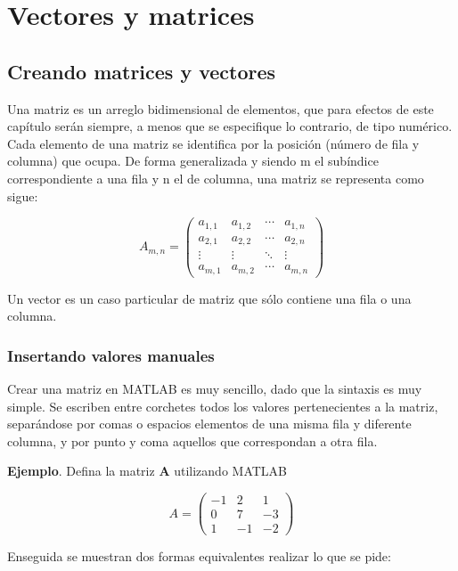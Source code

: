 \chapter{Vectores y matrices}\label{vectores-y-matrices}

\section{Creando matrices y vectores}\label{creando-matrices-y-vectores}

Una matriz es un arreglo bidimensional de elementos, que para efectos de
este capítulo serán siempre, a menos que se especifique lo contrario, de
tipo numérico. Cada elemento de una matriz se identifica por la posición
(número de fila y columna) que ocupa. De forma generalizada y siendo m
el subíndice correspondiente a una fila y n el de columna, una matriz se
representa como sigue:

$$
A_{m,n} = 
\begin{pmatrix}
a_{1,1} & a_{1,2} & \cdots & a_{1,n} \\
a_{2,1} & a_{2,2} & \cdots & a_{2,n} \\
\vdots  & \vdots  & \ddots & \vdots  \\
a_{m,1} & a_{m,2} & \cdots & a_{m,n} 
\end{pmatrix}
$$

Un vector es un caso particular de matriz que sólo contiene una fila o
una columna.

\subsection{Insertando valores
manuales}\label{insertando-valores-manuales}

Crear una matriz en MATLAB es muy sencillo, dado que la sintaxis es muy
simple. Se escriben entre corchetes todos los valores pertenecientes a
la matriz, separándose por comas o espacios elementos de una misma fila
y diferente columna, y por punto y coma aquellos que correspondan a otra
fila.

\textbf{Ejemplo}. Defina la matriz \textbf{A} utilizando MATLAB

$$
A = 
\begin{pmatrix}
    -1 & 2 & 1 \\
    0 & 7 & -3 \\
    1 & -1 & -2
\end{pmatrix}
$$

Enseguida se muestran dos formas equivalentes realizar lo que se pide:

